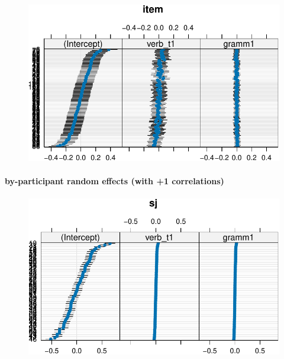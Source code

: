 \documentclass[
  letterpaper,
  DIV=11,
  numbers=noendperiod]{scrartcl}
\let\oldparagraph\paragraph
\renewcommand{\paragraph}[1]{\oldparagraph{#1}\mbox{}}
\newenvironment{Shaded}{\begin{snugshade}}{\end{snugshade}}
\newcommand{\FunctionTok}[1]{\textcolor[rgb]{0.28,0.35,0.67}{#1}}
\newcommand{\NormalTok}[1]{\textcolor[rgb]{0.00,0.23,0.31}{#1}}
\newcommand{\SpecialCharTok}[1]{\textcolor[rgb]{0.37,0.37,0.37}{#1}}
\begin{document}
\begin{figure}[H]

{\centering \includegraphics{12-model_selection_example_files/figure-pdf/unnamed-chunk-26-1.pdf}

}

\end{figure}

\hypertarget{by-participant-random-effects-with-1-correlations}{%
\paragraph{by-participant random effects (with +1
correlations)}\label{by-participant-random-effects-with-1-correlations}}

\begin{Shaded}
\end{Shaded}

\begin{figure}[H]

{\centering \includegraphics{12-model_selection_example_files/figure-pdf/unnamed-chunk-27-1.pdf}

}

\end{figure}
\end{document}
